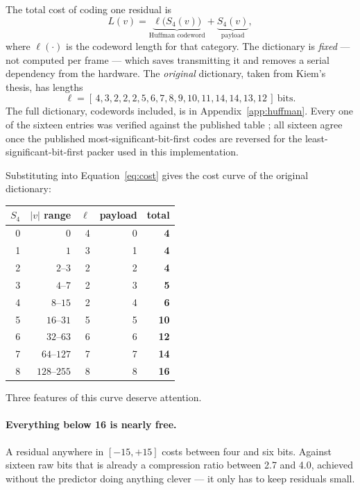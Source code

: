 The total cost of coding one residual is
\begin{equation}
\label{eq:cost}
L(v) = \underbrace{\ell\bigl(S_4(v)\bigr)}_{\text{Huffman codeword}}
     + \underbrace{S_4(v)}_{\text{payload}},
\end{equation}
where $\ell(\cdot)$ is the codeword length for that category. The dictionary is
\emph{fixed} --- not computed per frame --- which saves transmitting it and
removes a serial dependency from the hardware. The \emph{original} dictionary,
taken from Kiem's thesis, has lengths
\begin{equation}
\ell = [\,4,3,2,2,2,5,6,7,8,9,10,11,14,14,13,12\,]\ \text{bits}.
\end{equation}
The full dictionary, codewords included, is in Appendix~\ref{app:huffman}.
Every one of the sixteen entries was verified against the published table
\cite[Table~A.1]{kiem2025}; all sixteen agree once the published
most-significant-bit-first codes are reversed for the least-significant-bit-first
packer used in this implementation.

Substituting into Equation~\eqref{eq:cost} gives the cost curve of the original
dictionary:

\begin{table}[h]
\centering
\small
\begin{tabular}{@{}rrrrr@{}}
\toprule
$S_4$ & $|v|$ range & $\ell$ & payload & \textbf{total} \\
\midrule
0 & $0$        & 4 & 0 & \textbf{4}\\
1 & $1$        & 3 & 1 & \textbf{4}\\
2 & $2$--$3$   & 2 & 2 & \textbf{4}\\
3 & $4$--$7$   & 2 & 3 & \textbf{5}\\
4 & $8$--$15$  & 2 & 4 & \textbf{6}\\
5 & $16$--$31$ & 5 & 5 & \textbf{10}\\
6 & $32$--$63$ & 6 & 6 & \textbf{12}\\
7 & $64$--$127$& 7 & 7 & \textbf{14}\\
8 & $128$--$255$& 8 & 8 & \textbf{16}\\
\bottomrule
\end{tabular}
\end{table}

Three features of this curve deserve attention.

\paragraph{Everything below 16 is nearly free.}
A residual anywhere in $[-15, +15]$ costs between four and six bits. Against
sixteen raw bits that is already a compression ratio between \num{2.7} and
\num{4.0}, achieved without the predictor doing anything clever --- it only has
to keep residuals small.


